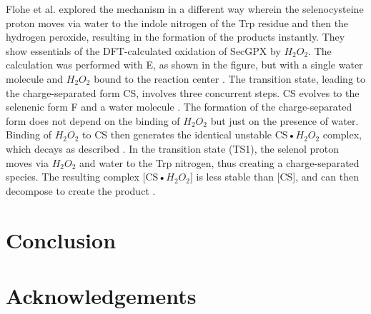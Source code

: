 \documentclass[journal=jacsat,manuscript=article]{achemso}
\begin{document}
Flohe et al. \cite{Orian2015} explored the mechanism in a different way wherein the selenocysteine proton moves via water to the indole nitrogen of the Trp residue and then the hydrogen peroxide, resulting in the formation of the products instantly. They show essentials of the DFT-calculated oxidation of SecGPX by $H_{2} O_{2}$. The calculation was performed with E, as shown in the figure, but with a single water molecule and $H_{2} O_{2}$ bound to the reaction center \cite{Orian2015}. The transition state, leading to the charge-separated form CS, involves three concurrent steps. CS evolves to the selenenic form F and a water molecule \cite{Orian2015}. The formation of the charge-separated form does not depend on the binding of $H_{2} O_{2}$ but just on the presence of water. Binding of $H_{2} O_{2}$ to CS then generates the identical unstable CS•$H_{2} O_{2}$ complex, which decays as described \cite{Orian2015}. In the transition state (TS1), the selenol proton moves via $H_{2} O_{2}$ and water to the Trp nitrogen, thus creating a charge-separated species. The resulting complex [CS•$H_{2} O_{2}$] is less stable than [CS], and can then decompose to create the product \cite{Orian2015}. 

\section{Conclusion}
  

\section{Acknowledgements}
  


\end{document}
